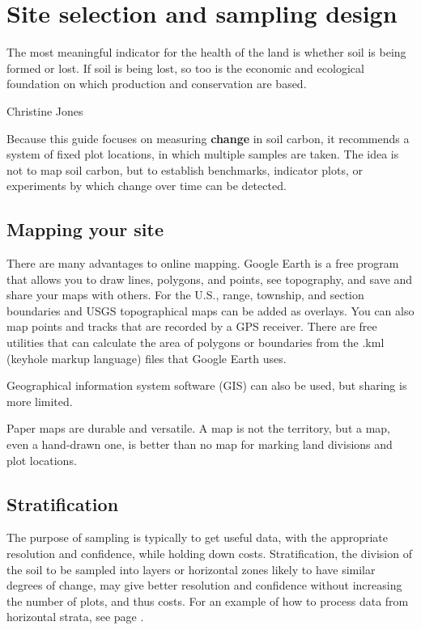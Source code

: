 \documentclass[11pt,letterpaper,oneside,onecolumn]{memoir}
\begin{document}
\chapter{Site selection and sampling design}

\epigraph{The most meaningful indicator for the health of the land is whether soil is being formed or lost. If soil is being lost, so too is the economic and ecological foundation on which production and conservation are based.}{Christine Jones}

\noindent Because this guide focuses on measuring \textbf{change} in soil carbon, it recommends a system of fixed plot locations, in which multiple samples are taken. The idea is not to map soil carbon, but to establish benchmarks, indicator plots, or experiments by which change over time can be detected.

\section{Mapping your site}

There are many advantages to online mapping. Google Earth is a free program that allows you to draw lines, polygons, and points, see topography, and save and share your maps with others. For the U.S., range, township, and section boundaries and USGS topographical maps can be added as overlays. You can also map points and tracks that are recorded by a GPS receiver. There are free utilities that can calculate the area of polygons or boundaries from the .kml (keyhole markup language) files that Google Earth uses.

Geographical information system software (GIS) can also be used, but sharing is more limited.

Paper maps are durable and versatile. A map is not the territory, but a map, even a hand-drawn one, is better than no map for marking land divisions and plot locations.

\section{Stratification}

The purpose of sampling is typically to get useful data, with the appropriate resolution and confidence, while holding down costs. Stratification, the division of the soil to be sampled into layers or horizontal zones likely to have similar degrees of change, may give better resolution and confidence without increasing the number of plots, and thus costs. For an example of how to process data from horizontal strata, see page \pageref{strat}.
\end{document}
